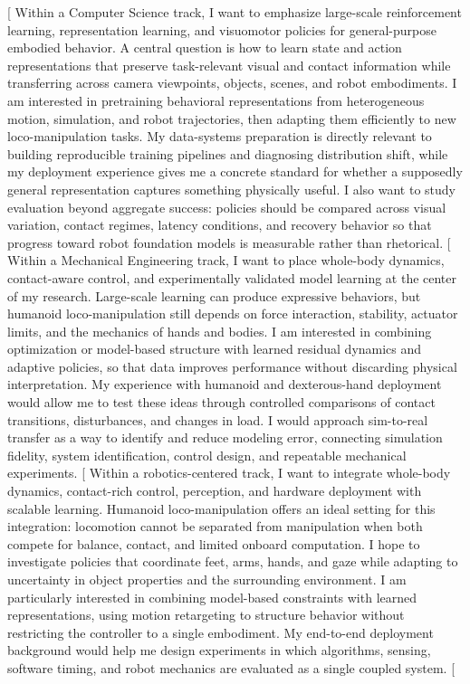 \documentclass[11pt,letterpaper]{article}
\begin{document}
[%
Within a Computer Science track, I want to emphasize large-scale reinforcement learning,
representation learning, and visuomotor policies for general-purpose embodied behavior. A central
question is how to learn state and action representations that preserve task-relevant visual and
contact information while transferring across camera viewpoints, objects, scenes, and robot
embodiments. I am interested in pretraining behavioral representations from heterogeneous motion,
simulation, and robot trajectories, then adapting them efficiently to new loco-manipulation tasks.
My data-systems preparation is directly relevant to building reproducible training pipelines and
diagnosing distribution shift, while my deployment experience gives me a concrete standard for
whether a supposedly general representation captures something physically useful. I also want to
study evaluation beyond aggregate success: policies should be compared across visual variation,
contact regimes, latency conditions, and recovery behavior so that progress toward robot foundation
models is measurable rather than rhetorical.
[%
Within a Mechanical Engineering track, I want to place whole-body dynamics, contact-aware control,
and experimentally validated model learning at the center of my research. Large-scale learning can
produce expressive behaviors, but humanoid loco-manipulation still depends on force interaction,
stability, actuator limits, and the mechanics of hands and bodies. I am interested in combining
optimization or model-based structure with learned residual dynamics and adaptive policies, so that
data improves performance without discarding physical interpretation. My experience with humanoid
and dexterous-hand deployment would allow me to test these ideas through controlled comparisons of
contact transitions, disturbances, and changes in load. I would approach sim-to-real transfer as a
way to identify and reduce modeling error, connecting simulation fidelity, system identification,
control design, and repeatable mechanical experiments.
[%
Within a robotics-centered track, I want to integrate whole-body dynamics, contact-rich control,
perception, and hardware deployment with scalable learning. Humanoid loco-manipulation offers an
ideal setting for this integration: locomotion cannot be separated from manipulation when both
compete for balance, contact, and limited onboard computation. I hope to investigate policies that
coordinate feet, arms, hands, and gaze while adapting to uncertainty in object properties and the
surrounding environment. I am particularly interested in combining model-based constraints with
learned representations, using motion retargeting to structure behavior without restricting the
controller to a single embodiment. My end-to-end deployment background would help me design
experiments in which algorithms, sensing, software timing, and robot mechanics are evaluated as a
single coupled system.
[%
\end{document}
